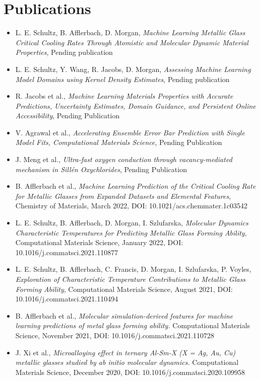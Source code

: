 \section{Publications}

\begin{itemize}
    \item L. E. Schultz, B. Afflerbach,  D. Morgan, \textit{Machine Learning Metallic Glass Critical Cooling Rates Through Atomistic and Molecular Dynamic Material Properties}, Pending publication
    \item L. E. Schultz, Y. Wang, R. Jacobs,  D. Morgan, \textit{Assessing Machine Learning Model Domains using Kernel Density Estimates}, Pending publication
    \item R. Jacobs et al., \textit{Machine Learning Materials Properties with Accurate Predictions, Uncertainty Estimates, Domain Guidance, and Persistent Online Accessibility}, Pending Publication
    \item V. Agrawal et al., \textit{Accelerating Ensemble Error Bar Prediction with Single Model Fits, Computational Materials Science}, Pending Publication
    \item J. Meng et al., \textit{Ultra-fast oxygen conduction through vacancy-mediated mechanism in Sillén Oxychlorides}, Pending Publication
    \item B. Afflerbach et al., \textit{Machine Learning Prediction of the Critical Cooling Rate for Metallic Glasses from Expanded Datasets and Elemental Features}, Chemistry of Materials, March 2022, DOI: 10.1021/acs.chemmater.1c03542
    \item L. E. Schultz, B. Afflerbach, D. Morgan, I. Szlufarska, \textit{Molecular Dynamics Characteristic Temperatures for Predicting Metallic Glass Forming Ability}, Computational Materials Science, January 2022, DOI: 10.1016/j.commatsci.2021.110877
    \item L. E. Schultz, B. Afflerbach, C. Francis, D. Morgan, I. Szlufarska, P. Voyles, \textit{Exploration of Characteristic Temperature Contributions to Metallic Glass Forming Ability}, Computational Materials Science, August 2021, DOI: 10.1016/j.commatsci.2021.110494
   \item B. Afflerbach et al., \textit{Molecular simulation-derived features for machine learning predictions of metal glass forming ability.} Computational Materials Science, November 2021, DOI: 10.1016/j.commatsci.2021.110728
    \item J. Xi et al., \textit{Microalloying effect in ternary Al-Sm-X (X = Ag, Au, Cu) metallic glasses studied by ab initio molecular dynamics.} Computational Materials Science, December 2020, DOI: 10.1016/j.commatsci.2020.109958

\end{itemize}
